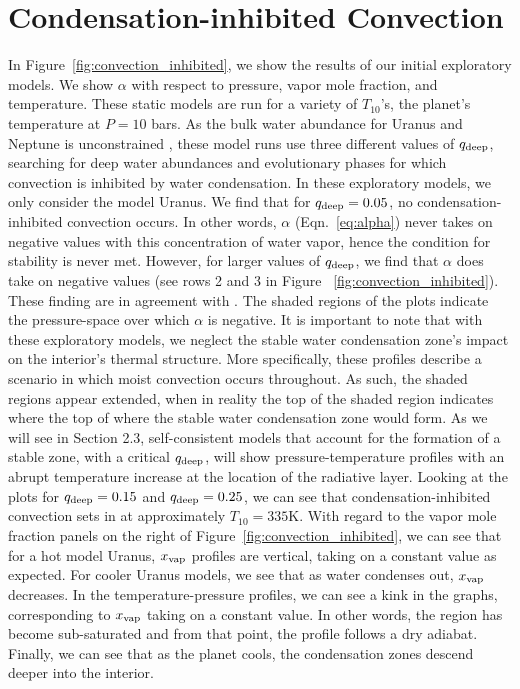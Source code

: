 \documentclass[11pt]{ucscthesisbs}
\begin{document}
\section{Condensation-inhibited Convection}
In Figure~\ref{fig:convection_inhibited}, we show the results of our initial exploratory models. We show $\alpha$ with respect to pressure, vapor mole fraction, and temperature. These static models are run for a variety of $T_{10}$'s, the planet's temperature at $P=10$ bars. As the bulk water abundance for Uranus and Neptune is unconstrained \citep{guillot_1995}, these model runs use three different values of $q_{\rm deep}$, searching for deep water abundances and evolutionary phases for which convection is inhibited by water condensation. In these exploratory models, we only consider the model Uranus. We find that for $q_{\rm deep} = 0.05$, no condensation-inhibited convection occurs. In other words, $\alpha$ (Eqn.~\ref{eq:alpha})  never takes on negative values with this concentration of water vapor, hence the condition for stability is never met. However, for larger values of $q_{\rm deep}$, we find that $\alpha$ does take{} on negative values (see rows 2 and 3 in Figure ~\ref{fig:convection_inhibited}). These finding are in agreement with \citep{friedson_2017,leconte_2017}. The shaded regions of the plots indicate the pressure-space over which $\alpha$ is negative. It is important to note that with these exploratory models, we neglect the stable water condensation zone's impact on the interior's thermal structure. More specifically, these profiles describe a scenario in which moist convection occurs throughout. As such, the shaded regions appear extended, when in reality the top of the shaded region indicates where the top of where the stable water condensation zone would form. As we will see in Section 2.3, self-consistent models that account for the formation of a stable zone, with a critical $q_{\rm deep}$, will show pressure-temperature profiles with an abrupt temperature increase at the location of the radiative layer. Looking at the plots for $q_{\rm deep} = 0.15$ and $q_{\rm deep} = 0.25$, we can see that condensation-inhibited convection sets in at approximately $T_{10} = 335$K. With regard to the vapor mole fraction panels on the right of Figure~\ref{fig:convection_inhibited}, we can see that for a hot model Uranus, $x_{\rm vap}$ profiles are vertical, taking on a constant value as expected. For cooler Uranus models, we see that as water condenses out, $x_{\rm vap}$ decreases. In the temperature-pressure profiles, we can see a kink in the graphs, corresponding to $x_{\rm vap}$ taking on a constant value. In other words, the region has become sub-saturated and from that point, the profile follows a dry adiabat. Finally, we can see that as the planet cools, the condensation zones descend deeper into the interior.
\end{document}
